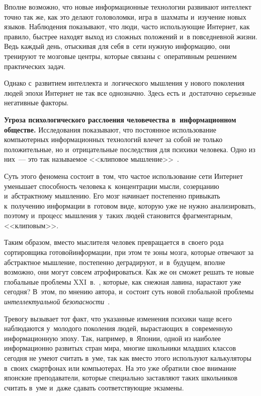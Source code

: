 \begin{multicols}{2}
    Вполне возможно, что новые информационные технологии развивают 
интеллект точно так же, как это делают головоломки, игра в~шахматы 
и~изучение новых языков. Наблюдения показывают, что люди, часто 
использующие Интернет, как правило, быстрее находят выход из сложных 
положений и~в повседневной жизни. Ведь каждый день, отыскивая для себя 
в~сети нужную информацию, они тренируют те мозговые центры, которые 
связаны с~оперативным решением практических задач. 
    
    Однако с~развитием интеллекта и~логического мышления у нового 
поколения людей эпохи Интернет не так все однозначно. Здесь есть 
и~достаточно серьезные негативные факторы.
    
    \textbf{Угроза психологического расслоения человечества 
в~информационном обществе.} Исследования показы\-вают, что постоянное 
использование компьютерных информационных технологий влечет за собой 
не только положительные, но и~отрицательные последствия для психики 
человека. Одно из них~--- это так называемое <<клиповое 
мышление>>~\cite{6-kol}. 
    
    Суть этого феномена состоит в~том, что частое использование сети 
Интернет уменьшает способность человека к~концентрации мысли, 
созерцанию и~абстрактному мышлению. Его мозг начинает постепенно 
привыкать к~получению информации в~готовом виде, которую уже не нужно 
анализировать, поэтому и~процесс мышления у~таких людей становится 
фрагментарным, <<клиповым>>. 
    
    Таким образом, вместо мыслителя человек превращается в~своего рода 
сортировщика готовой\linebreak информации, при этом те зоны мозга, которые 
отвеча\-ют за абстрактное мышление, постепенно деградируют, и~в~будущем, 
вполне возможно, они могут совсем атрофироваться. Как же он сможет 
решать те новые глобальные проблемы XXI~в.~\cite{29-kol}, которые, как 
снежная лавина, нарастают уже сегодня? В~этом, по мнению автора, 
и~состоит суть новой глобальной проблемы \textit{интеллектуальной 
без\-опас\-ности}~\cite{17-kol}.
    
    Тревогу вызывает тот факт, что указанные изменения психики чаще 
всего наблюдаются у~молодого поколения людей, вырастающих 
в~современную информационную эпоху. Так, например, в~Японии, одной из 
наиболее информационно развитых стран мира, многие школьники младших 
классов сегодня не умеют считать в~уме, так как вместо этого используют 
калькуляторы в~своих смартфонах или компьютерах. На это уже обратили 
свое внимание японские преподаватели, которые специально заставляют 
таких школьников считать в~уме и~даже сдавать соответствующие экзамены. 
    

\end{multicols}
